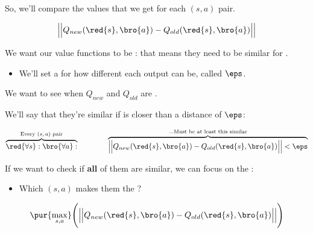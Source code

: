              So, we'll compare the values that we get for each $(s,a)$ pair.

             \begin{equation}
                \Big|\Big|
                    Q_{new}(\red{s},\bro{a}) - Q_{old}(\red{s},\bro{a})
                \Big|\Big|
             \end{equation}

         We want our value functions to be : that means they need to be similar for .
         
         \begin{itemize}
             \item We'll set a  for how different each output can be, called $\eps$.\\
         \end{itemize}

         

         \begin{definition}
            We want to see when $Q_{new}$ and $Q_{old}$ are .

            We'll say that they're similar if  is closer than a distance of $\eps$:

            \begin{equation*}
                \overbrace{
                    \red{\forall s}: \bro{\forall a}:
                    }^{\text{Every $(s,a)$ pair}}
                    \qquad \qquad
                \overbrace{
                    \Big|\Big|
                        Q_{new}(\red{s},\bro{a}) - Q_{old}(\red{s},\bro{a}) 
                    \Big|\Big|
                    < \eps
                }^{\text{...Must be at least this similar}}
             \end{equation*}
         \end{definition}
         
         If we want to check if \textbf{all} of them are similar, we can focus on the :

         \begin{itemize}
             \item Which $(s,a)$ makes them the ?
         \end{itemize}

         \begin{equation}
            \pur{\max_{s,a}}
            \Bigg(
            \Big|\Big|
                Q_{new}(\red{s},\bro{a}) - Q_{old}(\red{s},\bro{a})
            \Big|\Big|
            \Bigg)
         \end{equation}

